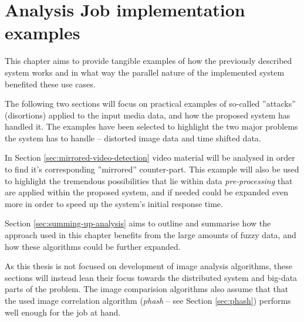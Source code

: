 \chapter{Analysis Job implementation examples}
\label{chap:analysis-examples}

This chapter aims to provide tangible examples of how the previously described system works and in what way the parallel nature of the implemented system benefited these use cases.

The following two sections will focus on practical examples of so-called ''attacks'' (disortions) applied to the input media data, and how the proposed system has handled it. The examples have been selected to highlight the two major problems the system has to handle -- distorted image data and time shifted data.

In Section \ref{sec:mirrored-video-detection} video material will be analysed in order to find it's corresponding ''mirrored'' counter-part. This example will also be used to highlight the tremendous possibilities that lie within data \textit{pre-processing} that are applied within the proposed system, and if needed could be expanded even more in order to speed up the system's initial response time.


Section \ref{sec:summing-up-analysis} aims to outline and summarise how the approach used in this chapter benefits from the large amounts of fuzzy data, and how these algorithms could be further expanded.

As this thesis is not focused on development of image analysis algorithms, these sections will instead lean their focus towards the distributed system and big-data parts of the problem. The image comparision algorithms also assume that that the used image correlation algorithm (\textit{phash} -- see Section \ref{sec:phash}) performs well enough for the job at hand. 


